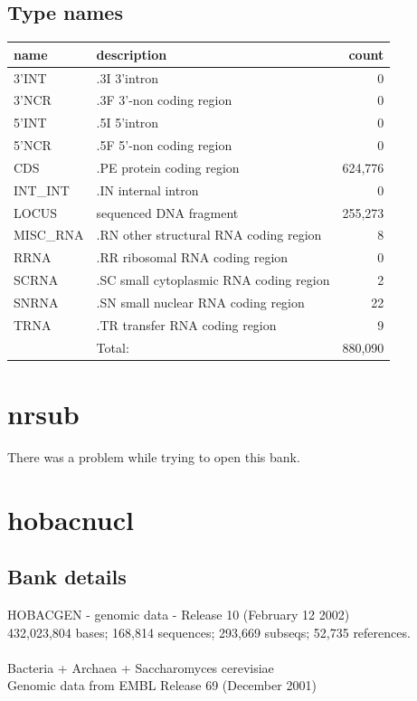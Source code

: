 \documentclass{article}
\begin{document}
\begin{Schunk}
\subsection{Type names}
\noindent\begin{tabular}{llr}
\hline \hline
name & description & count \\
\hline
3'INT  &  .3I 3'intron  &  0 \\
3'NCR  &  .3F  3'-non coding region  &  0 \\
5'INT  &  .5I 5'intron  &  0 \\
5'NCR  &  .5F  5'-non coding region  &  0 \\
CDS  &  .PE protein coding region  &  624,776 \\
INT\_INT  &  .IN  internal intron  &  0 \\
LOCUS  &  sequenced DNA fragment  &  255,273 \\
MISC\_RNA  &  .RN other structural RNA coding region  &  8 \\
RRNA  &  .RR ribosomal RNA coding region  &  0 \\
SCRNA  &  .SC small cytoplasmic RNA coding region  &  2 \\
SNRNA  &  .SN small nuclear RNA coding region  &  22 \\
TRNA  &  .TR transfer RNA coding region  &  9 \\
\hline
 & Total: & 880,090 \\
\hline \hline
\end{tabular}

\section{ nrsub }
There was a problem while trying to open this bank.
\section{ hobacnucl }
\subsection{Bank details}
HOBACGEN - genomic data - Release 10 (February 12 2002)\\
432,023,804 bases; 168,814 sequences; 293,669 subseqs; 52,735 references.\\
\\
Bacteria + Archaea + Saccharomyces cerevisiae\\
Genomic data from EMBL Release 69 (December 2001)\\



\end{Schunk}
\end{document}
